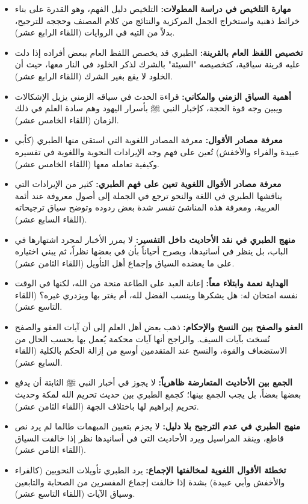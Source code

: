 \begin{itemize}
    \item \textbf{مهارة التلخيص في دراسة المطولات:} التلخيص دليل الفهم، وهو القدرة على بناء خرائط ذهنية واستخراج الجمل المركزية والنتائج من كلام المصنف وحججه للترجيح، بدلاً من التيه في الروايات (اللقاء الرابع عشر).
    \item \textbf{تخصيص اللفظ العام بالقرينة:} الطبري قد يخصص اللفظ العام ببعض أفراده إذا دلت عليه قرينة سياقية، كتخصيصه "السيئة" بالشرك لذكر الخلود في النار معها، حيث أن الخلود لا يقع بغير الشرك (اللقاء الرابع عشر).
    \item \textbf{أهمية السياق الزمني والمكاني:} قراءة الحدث في سياقه الزمني يزيل الإشكالات ويبين وجه قوة الحجة، كإخبار النبي ﷺ بأسرار اليهود وهم سادة العلم في ذلك الزمان (اللقاء الخامس عشر).
    \item \textbf{معرفة مصادر الأقوال:} معرفة المصادر اللغوية التي استقى منها الطبري (كأبي عبيدة والفراء والأخفش) تُعين على فهم وجه الإيرادات النحوية واللغوية في تفسيره وكيفية تعامله معها (اللقاء الخامس عشر).
    \item \textbf{معرفة مصادر الأقوال اللغوية تعين على فهم الطبري:} كثير من الإيرادات التي يناقشها الطبري في اللغة والنحو ترجع في الجملة إلى أصول معروفة عند أئمة العربية، ومعرفة هذه المناشئ تفسر شدة بعض ردوده وتوضح سياق ترجيحاته (اللقاء السابع عشر).
    \item \textbf{منهج الطبري في نقد الأحاديث داخل التفسير:} لا يمرر الأخبار لمجرد اشتهارها في الباب، بل ينظر في أسانيدها، ويصرح أحياناً بأن في بعضها نظراً، ثم يبني اختياره على ما يعضده السياق وإجماع أهل التأويل (اللقاء الثامن عشر).
    \item \textbf{الهداية نعمة وابتلاء معاً:} إعانة العبد على الطاعة منحة من الله، لكنها في الوقت نفسه امتحان له: هل يشكرها وينسب الفضل لله، أم يغتر بها ويزدري غيره؟ (اللقاء التاسع عشر).
    \item \textbf{العفو والصفح بين النسخ والإحكام:} ذهب بعض أهل العلم إلى أن آيات العفو والصفح نُسخت بآيات السيف. والراجح أنها آيات محكمة يُعمل بها بحسب الحال من الاستضعاف والقوة، والنسخ عند المتقدمين أوسع من إزالة الحكم بالكلية (اللقاء السابع عشر).
    \item \textbf{الجمع بين الأحاديث المتعارضة ظاهرياً:} لا يجوز في أخبار النبي ﷺ الثابتة أن يدفع بعضها بعضاً، بل يجب الجمع بينها؛ كجمع الطبري بين حديث تحريم الله لمكة وحديث تحريم إبراهيم لها باختلاف الجهة (اللقاء الثامن عشر).
    \item \textbf{منهج الطبري في عدم الترجيح بلا دليل:} لا يجزم بتعيين المبهمات طالما لم يرد نص قاطع، وينقد المراسيل ويرد الأحاديث التي في أسانيدها نظر إذا خالفت السياق (اللقاء الثامن عشر).
    \item \textbf{تخطئة الأقوال اللغوية لمخالفتها الإجماع:} يرد الطبري تأويلات النحويين (كالفراء والأخفش وأبي عبيدة) بشدة إذا خالفت إجماع المفسرين من الصحابة والتابعين وسياق الآيات (اللقاء التاسع عشر).
\end{itemize}

